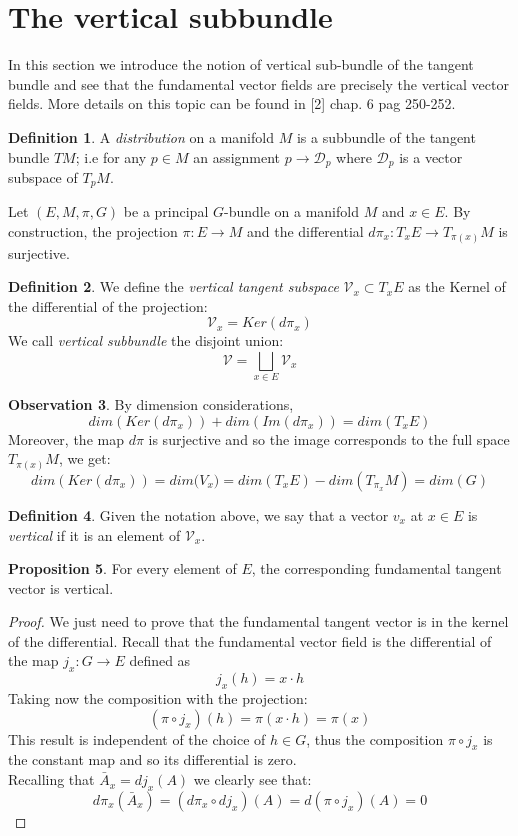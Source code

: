 \documentclass[12pt,a4paper]{report}
\theoremstyle{definition}
\newtheorem{Def}{Definition}[chapter]
\theoremstyle{Theorem}
\newtheorem{Prop}[Def]{Proposition}
\theoremstyle{definition}
\theoremstyle{definition}
\newtheorem{Obs}[Def]{Observation}
\begin{document}
	\section{The vertical subbundle}
	In this section we introduce the notion of vertical sub-bundle of the tangent bundle and see that the fundamental vector fields are precisely the vertical vector fields. More details on this topic can be found in [2] chap. 6 pag 250-252.
	\begin{Def}
		A \textit{distribution} on a manifold $M$ is a subbundle of the tangent bundle $TM$; i.e for any $p\in M$ an assignment $p\rightarrow \mathcal{D}_p$ where $\mathcal{D}_p$ is a vector subspace of $T_pM$.
	\end{Def}
	Let $(E,M,\pi,G)$ be a principal $G$-bundle on a manifold $M$ and $x\in E$. By construction, the projection $\pi:E\rightarrow M$ and the differential $d\pi_{x}:T_{x}E\rightarrow T_{\pi(x)}M$ is surjective. 
	\begin{Def}
		We define the \textit{vertical tangent subspace} $\mathcal{V}_{x}\subset T_{x}E$ as the Kernel of the differential of the projection:
		$$\mathcal{V}_{x}= Ker(d\pi_{x})$$
		We call \textit{vertical subbundle} the disjoint union:
		$$\mathcal{V}=\bigsqcup_{x\in E}\mathcal{V}_x$$
	\end{Def}
	\begin{Obs}
		By dimension considerations, 
		$$dim (Ker(d\pi_{x}))+dim(Im(d\pi_{x}))=dim(T_{x}E)$$
		Moreover, the map $d\pi$ is surjective and so the image corresponds to the full space $T_{\pi(x)}M$, we get:
		$$dim (Ker(d\pi_{x}))=dim\mathcal({V}_{x})=dim(T_{x}E)-dim(T_{\pi_{x}}M)=dim (G)$$
	\end{Obs}
	\begin{Def}
		Given the notation above, we say that a vector $v_x$ at $x\in E$ is \textit{vertical} if it is an element of $\mathcal{V}_x$.
	\end{Def}
	\begin{Prop}\label{fund_vec_are_vert}
		For every element of $E$, the corresponding fundamental tangent vector is vertical.
	\end{Prop}
	\begin{proof}
		We just need to prove that the fundamental tangent vector is in the kernel of the differential. Recall that the fundamental vector field is the differential of the map $j_{x}:G\rightarrow E$ defined as 
		$$j_{x}(h)=x\cdot h $$
		Taking now the composition with the projection:
		$$(\pi\circ j_{x})(h)=\pi(x\cdot h)=\pi(x)$$
		This result is independent of the choice of $h\in G$, thus the composition $\pi\circ j_{x}$ is the constant map and so its differential is zero.\\
		Recalling that $\bar{A}_{x}=dj_{x}(A)$ we clearly see that:
		$$d\pi_{x}(\bar{A}_{x})=
		(d\pi_{x}\circ dj_{x})(A)=
		d(\pi\circ j_{x})(A)=0$$
	\end{proof}
\end{document}
